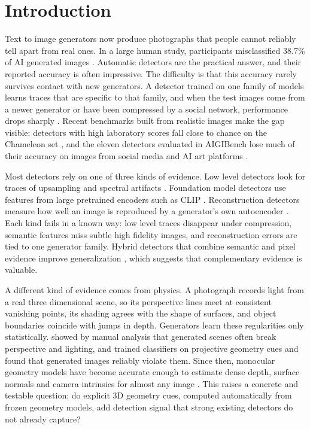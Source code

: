 \documentclass[11pt,a4paper]{article}
\begin{document}
\section{Introduction}
\label{sec:intro}

Text to image generators now produce photographs that people cannot reliably tell apart from real ones. In a large human study, participants misclassified 38.7\% of AI generated images \citep{lu2023seeing}. Automatic detectors are the practical answer, and their reported accuracy is often impressive. The difficulty is that this accuracy rarely survives contact with new generators. A detector trained on one family of models learns traces that are specific to that family, and when the test images come from a newer generator or have been compressed by a social network, performance drops sharply \citep{corvi2023detection,ojha2023univfd}. Recent benchmarks built from realistic images make the gap visible: detectors with high laboratory scores fall close to chance on the Chameleon set \citep{yan2025aide}, and the eleven detectors evaluated in AIGIBench lose much of their accuracy on images from social media and AI art platforms \citep{li2025aigibench}.

Most detectors rely on one of three kinds of evidence. Low level detectors look for traces of upsampling and spectral artifacts \citep{wang2020cnnspot,frank2020frequency,tan2024npr}. Foundation model detectors use features from large pretrained encoders such as CLIP \citep{ojha2023univfd,koutlis2024rine,yan2025effort}. Reconstruction detectors measure how well an image is reproduced by a generator's own autoencoder \citep{wang2023dire,ricker2024aeroblade}. Each kind fails in a known way: low level traces disappear under compression, semantic features miss subtle high fidelity images, and reconstruction errors are tied to one generator family. Hybrid detectors that combine semantic and pixel evidence improve generalization \citep{yan2025aide,cheng2025cospy}, which suggests that complementary evidence is valuable.

A different kind of evidence comes from physics. A photograph records light from a real three dimensional scene, so its perspective lines meet at consistent vanishing points, its shading agrees with the shape of surfaces, and object boundaries coincide with jumps in depth. Generators learn these regularities only statistically. \citet{farid2022perspective,farid2022lighting} showed by manual analysis that generated scenes often break perspective and lighting, and \citet{sarkar2024shadows} trained classifiers on projective geometry cues and found that generated images reliably violate them. Since then, monocular geometry models have become accurate enough to estimate dense depth, surface normals and camera intrinsics for almost any image \citep{wang2025moge,yang2024depthanything2,bae2024dsine}. This raises a concrete and testable question: do explicit 3D geometry cues, computed automatically from frozen geometry models, add detection signal that strong existing detectors do not already capture?
\end{document}
